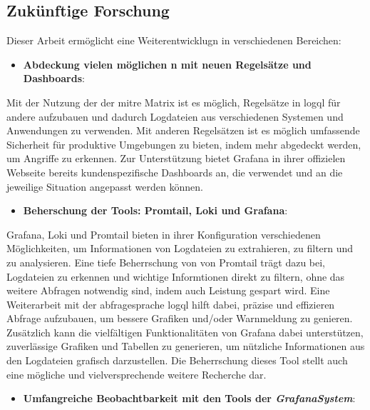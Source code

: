 \subsection{Zukünftige Forschung}
Dieser Arbeit ermöglicht eine Weiterentwicklugn in verschiedenen Bereichen:
 
\begin{itemize}[noitemsep]
    \item \textbf{Abdeckung vielen möglichen n mit neuen Regelsätze und Dashboards}:
\end{itemize}

Mit der Nutzung der  der \gls{mitre} Matrix ist es möglich, Regelsätze in \gls{logql} für andere  aufzubauen und dadurch Logdateien aus verschiedenen Systemen und Anwendungen zu verwenden. Mit anderen Regelsätzen ist es möglich umfassende Sicherheit für produktive Umgebungen zu bieten, indem mehr  abgedeckt werden, um Angriffe zu erkennen. Zur Unterstützung bietet Grafana in ihrer offizielen Webseite bereits kundenspezifische Dashboards an, die verwendet und an die jeweilige Situation angepasst werden können.

\begin{itemize}[noitemsep]
    \item \textbf{Beherschung der Tools: Promtail, Loki und Grafana}:
\end{itemize}

Grafana, Loki und Promtail bieten in ihrer Konfiguration verschiedenen Möglichkeiten, um Informationen von Logdateien zu extrahieren, zu filtern und zu analysieren. Eine tiefe Beherrschung von  von Promtail trägt dazu bei, Logdateien zu erkennen und wichtige Informtionen direkt zu filtern, ohne das weitere Abfragen notwendig sind, indem auch Leistung gespart wird. Eine Weiterarbeit mit der \gls{abfragesprache} \gls{logql} hilft dabei, präzise und effizieren Abfrage aufzubauen, um bessere Grafiken und/oder Warnmeldung zu genieren. Zusätzlich kann die vielfältigen Funktionalitäten von Grafana dabei unterstützen, zuverlässige Grafiken und Tabellen zu generieren, um nützliche Informationen aus den Logdateien grafisch darzustellen. Die Beherrschung dieses Tool stellt auch eine mögliche und vielversprechende weitere Recherche dar. 


\begin{itemize}[noitemsep]
    \item \textbf{Umfangreiche Beobachtbarkeit mit den Tools der \textit{\gls{GrafanaSystem}}}:
\end{itemize}

